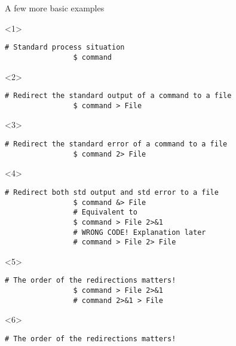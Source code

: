 \begin{frame}[fragile]{A few more basic examples}
    \begin{overlayarea}{\textwidth}{0.2\textheight}
        \begin{onlyenv}<1>
            \begin{lstlisting}[style=MyBash, numbers=none]
                # Standard process situation
                $ command
            \end{lstlisting}
        \end{onlyenv}
        \begin{onlyenv}<2>
            \begin{lstlisting}[style=MyBash, numbers=none]
                # Redirect the standard output of a command to a file
                $ command > File
            \end{lstlisting}
        \end{onlyenv}
        \begin{onlyenv}<3>
            \begin{lstlisting}[style=MyBash, numbers=none]
                # Redirect the standard error of a command to a file
                $ command 2> File
            \end{lstlisting}
        \end{onlyenv}
        \begin{onlyenv}<4>
            \begin{lstlisting}[style=MyBash, numbers=none]
                # Redirect both std output and std error to a file
                $ command &> File
                # Equivalent to
                $ command > File 2>&1
                # WRONG CODE! Explanation later
                # command > File 2> File 
            \end{lstlisting}
        \end{onlyenv}
        \begin{onlyenv}<5>
            \begin{lstlisting}[style=MyBash, numbers=none]
                # The order of the redirections matters!
                $ command > File 2>&1
                # command 2>&1 > File
            \end{lstlisting}
        \end{onlyenv}
        \begin{onlyenv}<6>
            \begin{lstlisting}[style=MyBash, numbers=none]
                # The order of the redirections matters!

\end{lstlisting}
\end{onlyenv}
\end{overlayarea}
\end{frame}
